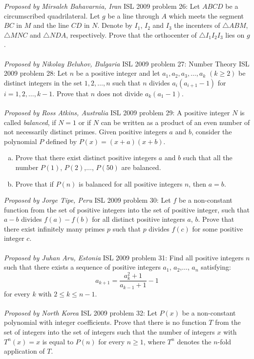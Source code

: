 \textit{Proposed by  Mirsaleh Bahavarnia, Iran} 
ISL 2009 problem 26:  Let $ABCD$ be a circumscribed quadrilateral. Let $g$ be a line through $A$ which meets the segment $BC$ in $M$ and the line $CD$ in $N$. Denote by $I_1$, $I_2$ and $I_3$ the incenters of $\triangle ABM$, $\triangle MNC$ and $\triangle NDA$, respectively. Prove that the orthocenter of $\triangle I_1I_2I_3$ lies on $g$. \\\\
\textit{Proposed by Nikolay Beluhov, Bulgaria} 
ISL 2009 problem 27:  Number Theory 
ISL 2009 problem 28:  Let $ n$ be a positive integer and let $ a_1,a_2,a_3,\ldots,a_k$ $ ( k\ge 2)$ be distinct integers in the set $ { 1,2,\ldots,n}$ such that $ n$ divides $ a_i(a_{i + 1} - 1)$ for $ i = 1,2,\ldots,k - 1$. Prove that $ n$ does not divide $ a_k(a_1 - 1).$ \\\\
\textit{Proposed by Ross Atkins, Australia } 
ISL 2009 problem 29:  A positive integer $N$ is called \textit{balanced}, if $N=1$ or if $N$ can be written as a product of an even number of not necessarily distinct primes. Given positive integers $a$ and $b$, consider the polynomial $P$ defined by $P(x)=(x+a)(x+b)$.
\begin{enumerate}[(a)]
  \item Prove that there exist distinct positive integers $a$ and $b$ such that all the number $P(1)$, $P(2)$,$\ldots$, $P(50)$ are balanced.
  \item Prove that if $P(n)$ is balanced for all positive integers $n$, then $a=b$.
\end{enumerate}
\textit{Proposed by Jorge Tipe, Peru} 
ISL 2009 problem 30:  Let $f$ be a non-constant function from the set of positive integers into the set of positive integer, such that $a-b$ divides $f(a)-f(b)$ for all distinct positive integers $a$, $b$. Prove that there exist infinitely many primes $p$ such that $p$ divides $f(c)$ for some positive integer $c$. \\\\
\textit{Proposed by Juhan Aru, Estonia} 
ISL 2009 problem 31:  Find all positive integers $n$ such that there exists a sequence of positive integers $a_1$, $a_2$,$\ldots$, $a_n$ satisfying:
\[ a_{k+1}=\frac{a_k^2+1}{a_{k-1}+1}-1 \]
for every $k$ with $2\leq k\leq n-1$. \\\\
\textit{Proposed by North Korea} 
ISL 2009 problem 32:  Let $P(x)$ be a non-constant polynomial with integer coefficients. Prove that there is no function $T$ from the set of integers into the set of integers such that the number of integers $x$ with $T^n(x)=x$ is equal to $P(n)$ for every $n\geq 1$, where $T^n$ denotes the $n$-fold application of $T$. \\\\
